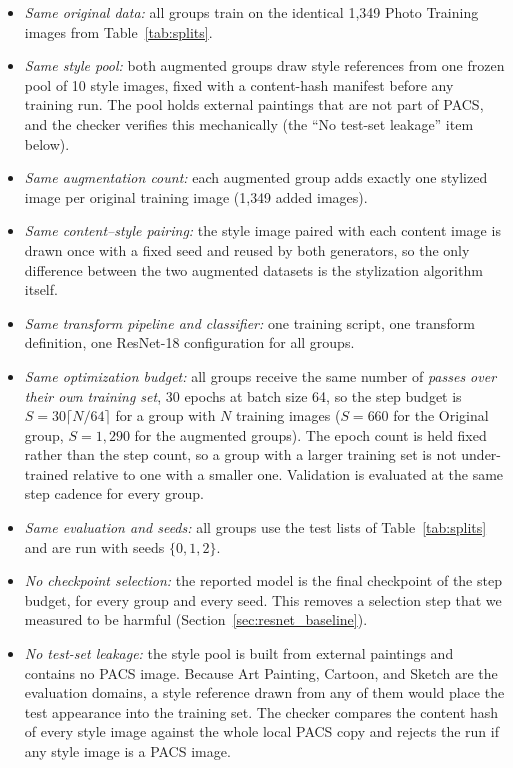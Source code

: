 \begin{itemize}
\item \textit{Same original data:} all groups train on the identical 1{,}349 Photo Training images from Table~\ref{tab:splits}.
\item \textit{Same style pool:} both augmented groups draw style references from one frozen pool of 10 style images, fixed with a content-hash manifest before any training run. The pool holds external paintings that are not part of PACS, and the checker verifies this mechanically (the ``No test-set leakage'' item below).
\item \textit{Same augmentation count:} each augmented group adds exactly one stylized image per original training image (1{,}349 added images).
\item \textit{Same content--style pairing:} the style image paired with each content image is drawn once with a fixed seed and reused by both generators, so the only difference between the two augmented datasets is the stylization algorithm itself.
\item \textit{Same transform pipeline and classifier:} one training script, one transform definition, one ResNet-18 configuration for all groups.
\item \textit{Same optimization budget:} all groups receive the same number of \emph{passes over their own training set}, 30 epochs at batch size 64, so the step budget is $S = 30\lceil N/64\rceil$ for a group with $N$ training images ($S = 660$ for the Original group, $S = 1{,}290$ for the augmented groups). The epoch count is held fixed rather than the step count, so a group with a larger training set is not under-trained relative to one with a smaller one. Validation is evaluated at the same step cadence for every group.
\item \textit{Same evaluation and seeds:} all groups use the test lists of Table~\ref{tab:splits} and are run with seeds $\{0, 1, 2\}$.
\item \textit{No checkpoint selection:} the reported model is the final checkpoint of the step budget, for every group and every seed. This removes a selection step that we measured to be harmful (Section~\ref{sec:resnet_baseline}).
\item \textit{No test-set leakage:} the style pool is built from external paintings and contains no PACS image. Because Art Painting, Cartoon, and Sketch are the evaluation domains, a style reference drawn from any of them would place the test appearance into the training set. The checker compares the content hash of every style image against the whole local PACS copy and rejects the run if any style image is a PACS image.

\end{itemize}
